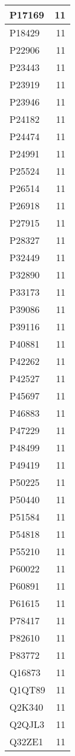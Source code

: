 \documentclass[
]{book}
\theoremstyle{definition}
\theoremstyle{definition}
\theoremstyle{definition}
\theoremstyle{definition}
\theoremstyle{remark}
\begin{document}
\begin{table}
\begin{tabular}{l|r}
\hline
P17169 & 11\\
\hline
P18429 & 11\\
\hline
P22906 & 11\\
\hline
P23443 & 11\\
\hline
P23919 & 11\\
\hline
P23946 & 11\\
\hline
P24182 & 11\\
\hline
P24474 & 11\\
\hline
P24991 & 11\\
\hline
P25524 & 11\\
\hline
P26514 & 11\\
\hline
P26918 & 11\\
\hline
P27915 & 11\\
\hline
P28327 & 11\\
\hline
P32449 & 11\\
\hline
P32890 & 11\\
\hline
P33173 & 11\\
\hline
P39086 & 11\\
\hline
P39116 & 11\\
\hline
P40881 & 11\\
\hline
P42262 & 11\\
\hline
P42527 & 11\\
\hline
P45697 & 11\\
\hline
P46883 & 11\\
\hline
P47229 & 11\\
\hline
P48499 & 11\\
\hline
P49419 & 11\\
\hline
P50225 & 11\\
\hline
P50440 & 11\\
\hline
P51584 & 11\\
\hline
P54818 & 11\\
\hline
P55210 & 11\\
\hline
P60022 & 11\\
\hline
P60891 & 11\\
\hline
P61615 & 11\\
\hline
P78417 & 11\\
\hline
P82610 & 11\\
\hline
P83772 & 11\\
\hline
Q16873 & 11\\
\hline
Q1QT89 & 11\\
\hline
Q2K340 & 11\\
\hline
Q2QJL3 & 11\\
\hline
Q32ZE1 & 11\\

\end{tabular}
\end{table}
\end{document}
